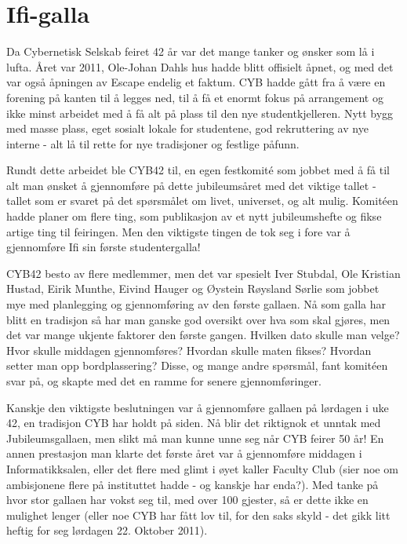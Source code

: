 \chapter{Ifi-galla}

\author{Skrevet av Arne Hassel}

Da Cybernetisk Selskab feiret 42 år var det mange tanker og ønsker som lå i lufta. Året var 2011, Ole-Johan Dahls hus hadde blitt offisielt åpnet, og med det var også åpningen av Escape endelig et faktum. CYB hadde gått fra å være en forening på kanten til å legges ned, til å få et enormt fokus på arrangement og ikke minst arbeidet med å få alt på plass til den nye studentkjelleren. Nytt bygg med masse plass, eget sosialt lokale for studentene, god rekruttering av nye interne - alt lå til rette for nye tradisjoner og festlige påfunn.

Rundt dette arbeidet ble CYB42 til, en egen festkomité som jobbet med å få til alt man ønsket å gjennomføre på dette jubileumsåret med det viktige tallet - tallet som er svaret på det spørsmålet om livet, universet, og alt mulig. Komitéen hadde planer om flere ting, som publikasjon av et nytt jubileumshefte og fikse artige ting til feiringen. Men den viktigste tingen de tok seg i fore var å gjennomføre Ifi sin første studentergalla!

CYB42 besto av flere medlemmer, men det var spesielt Iver Stubdal, Ole Kristian Hustad, Eirik Munthe, Eivind Hauger og Øystein Røysland Sørlie som jobbet mye med planlegging og gjennomføring av den første gallaen. Nå som galla har blitt en tradisjon så har man ganske god oversikt over hva som skal gjøres, men det var mange ukjente faktorer den første gangen. Hvilken dato skulle man velge? Hvor skulle middagen gjennomføres? Hvordan skulle maten fikses? Hvordan setter man opp bordplassering? Disse, og mange andre spørsmål, fant komitéen svar på, og skapte med det en ramme for senere gjennomføringer.

Kanskje den viktigste beslutningen var å gjennomføre gallaen på lørdagen i uke 42, en tradisjon CYB har holdt på siden. Nå blir det riktignok et unntak med Jubileumsgallaen, men slikt må man kunne unne seg når CYB feirer 50 år! En annen prestasjon man klarte det første året var å gjennomføre middagen i Informatikksalen, eller det flere med glimt i øyet kaller Faculty Club (sier noe om ambisjonene flere på instituttet hadde - og kanskje har enda?). Med tanke på hvor stor gallaen har vokst seg til, med over 100 gjester, så er dette ikke en mulighet lenger (eller noe CYB har fått lov til, for den saks skyld - det gikk litt heftig for seg lørdagen 22. Oktober 2011).

